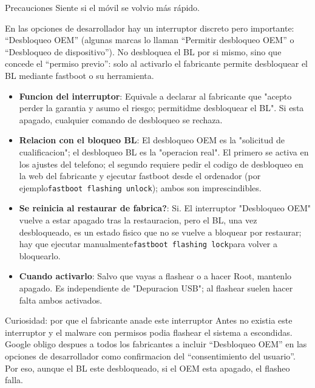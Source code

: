 \begin{tcbwarn}{Precauciones}
Siente si el móvil se volvio más rápido.

\end{tcbwarn}


En las opciones de desarrollador hay un interruptor discreto pero importante: “Desbloqueo OEM” (algunas marcas lo llaman “Permitir desbloqueo OEM” o “Desbloqueo de dispositivo”). No desbloquea el BL por si mismo, sino que concede el “permiso previo”: solo al activarlo el fabricante permite desbloquear el BL mediante fastboot o su herramienta.

\begin{itemize}
  \item \textbf{Funcion del interruptor}: Equivale a declarar al fabricante que "acepto perder la garantia y asumo el riesgo; permitidme desbloquear el BL". Si esta apagado, cualquier comando de desbloqueo se rechaza.
  \item \textbf{Relacion con el bloqueo BL}: El desbloqueo OEM es la "solicitud de cualificacion"; el desbloqueo BL es la "operacion real". El primero se activa en los ajustes del telefono; el segundo requiere pedir el codigo de desbloqueo en la web del fabricante y ejecutar fastboot desde el ordenador (por ejemplo\texttt{fastboot flashing unlock}); ambos son imprescindibles.
  \item \textbf{Se reinicia al restaurar de fabrica?}: Si. El interruptor "Desbloqueo OEM" vuelve a estar apagado tras la restauracion, pero el BL, una vez desbloqueado, es un estado fisico que no se vuelve a bloquear por restaurar; hay que ejecutar manualmente\texttt{fastboot flashing lock}para volver a bloquearlo.
  \item \textbf{Cuando activarlo}: Salvo que vayas a flashear o a hacer Root, mantenlo apagado. Es independiente de "Depuracion USB"; al flashear suelen hacer falta ambos activados.
\end{itemize}

\begin{tcbinfo}{Curiosidad: por que el fabricante anade este interruptor}
Antes no existia este interruptor y el malware con permisos podia flashear el sistema a escondidas. Google obligo despues a todos los fabricantes a incluir “Desbloqueo OEM” en las opciones de desarrollador como confirmacion del “consentimiento del usuario”. Por eso, aunque el BL este desbloqueado, si el OEM esta apagado, el flasheo falla.

\end{tcbinfo}

